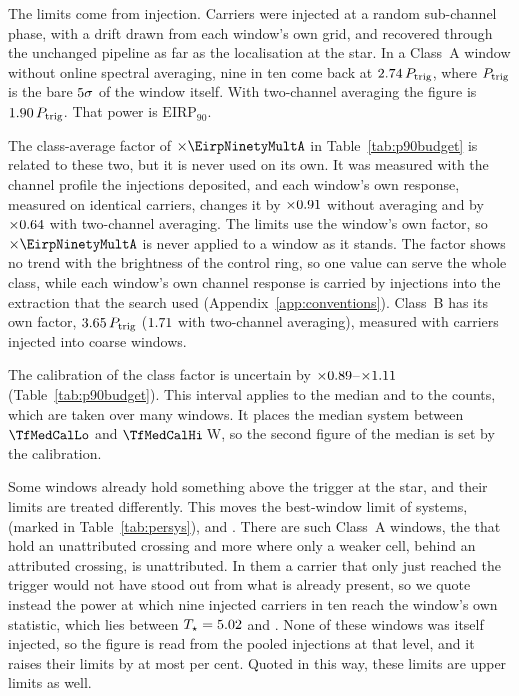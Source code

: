 The limits come from injection. Carriers were injected at a random
sub-channel phase, with a drift drawn from each window's own grid, and
recovered through the unchanged pipeline as far as the localisation at the
star. In a Class~A window without online spectral averaging, nine in ten
come back at $2.74\,P_{\rm trig}$, where $P_{\rm trig}$ is the bare
$5\sigma$ of the window itself. With two-channel averaging the
figure is $1.90\,P_{\rm trig}$. That power is $\mathrm{EIRP}_{90}$.

The class-average factor of $\times\EirpNinetyMultA$ in
Table~\ref{tab:p90budget} is related to these two, but it is never used on
its own. It was measured with the channel profile the injections deposited,
and each window's own response, measured on identical carriers, changes it
by $\times0.91$ without averaging and by $\times0.64$ with
two-channel averaging. The limits use the window's own factor, so
$\times\EirpNinetyMultA$ is never applied to a window as it stands. The
factor shows no trend with the brightness of the control ring, so one value
can serve the whole class, while each window's own channel response is
carried by injections into the extraction that the search used
(Appendix~\ref{app:conventions}). Class~B has its own factor,
$3.65\,P_{\rm trig}$ ($1.71$ with two-channel averaging),
measured with \SensNToneCoarse{} carriers injected into \SensNInjCoarse{}
coarse windows.

The calibration of the class factor is uncertain by
$\times0.89$--$\times1.11$ (Table~\ref{tab:p90budget}). This
interval applies to the median and to the counts, which are taken over
many windows. It places the median system between $\TfMedCalLo$ and
$\TfMedCalHi$\,W, so the second figure of the median is set by the
calibration.

Some windows already hold something above the trigger at the star, and
their limits are treated differently. This moves the best-window limit of
\XwNSysWord{} systems, \XwSysNames{} (marked \XwMark{} in
Table~\ref{tab:persys}), and \XwHeadlineClause. There are \XwNWin{} such Class~A windows, the \CeObs{}
that hold an unattributed crossing and \XwNWinSecWord{} more where only a
weaker cell, behind an attributed crossing, is unattributed. In them a
carrier that only just reached the trigger would not have stood out from
what is already present, so we quote instead the power at which nine
injected carriers in ten reach the window's own statistic, which lies
between $T_\star=5.02$ and \XwTobsHi. None of these windows was itself
injected, so the figure is read from the pooled injections at that level,
and it raises their limits by at most \XwFacMaxPct{} per cent. Quoted in
this way, these limits are upper limits as well.

